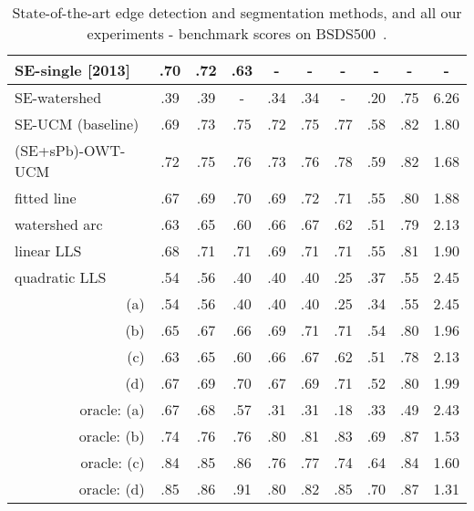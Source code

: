 \begin{table}[htbp]
\begin{tabular}{l|c|c|c||c|c|c||c|c|c|}
\hline
\hline
\multicolumn{1}{|l|}{\cite{DollarICCV13edges} SE-single [2013]} & .70 & .72 & .63 & - & - & - & - & - & - \\
\hline
\hline
\multicolumn{1}{|l|}{SE-watershed} & .39 & .39 & - & .34 & .34 & - & .20 & .75 & 6.26 \\
\hline
\multicolumn{1}{|l|}{SE-UCM (baseline)} & .69 &.73 & .75 & .72 & .75 & .77 & .58 & .82 & 1.80 \\
\hline
\multicolumn{1}{|l|}{(SE+sPb)-OWT-UCM} & .72 & .75 & .76 & .73 & .76 & .78 & .59 & .82 & 1.68 \\ %
\hline
\hline
\multicolumn{1}{|l|}{fitted line} &  .67 & .69 & .70 & .69 & .72 & .71 & .55 & .80 & 1.88 \\ %
\hline
\multicolumn{1}{|l|}{watershed arc} & .63 & .65 & .60 & .66 & .67 & .62 & .51 & .79 & 2.13 \\ %
\hline
\hline
\multicolumn{1}{|l|}{linear LLS} & .68 & .71 & .71 & .69 & .71 & .71 & .55 & .81 & 1.90 \\%
\hline
\multicolumn{1}{|l|}{quadratic LLS} & .54 & .56 & .40 & .40 & .40 & .25 & .37 & .55 & 2.45 \\
\hline
\hline
\multicolumn{1}{|r|}{(a)} & .54 & .56 & .40 & .40 & .40 & .25 & .34 & .55 & 2.45 \\
\multicolumn{1}{|r|}{(b)} & .65 & .67 & .66 & .69 & .71 & .71 & .54 & .80 & 1.96 \\
\multicolumn{1}{|r|}{(c)} & .63 & .65 & .60 & .66 & .67 & .62 & .51 & .78 & 2.13 \\
\multicolumn{1}{|r|}{(d)} & .67 & .69 & .70 & .67 & .69 & .71 & .52 & .80 & 1.99 \\
\multicolumn{1}{|r|}{oracle: (a)} & .67 & .68 & .57 & .31 & .31 & .18 & .33 & .49 & 2.43 \\
\multicolumn{1}{|r|}{oracle: (b)} & .74 & .76 & .76 & .80 & .81 & .83 & .69 & .87 & 1.53 \\
\multicolumn{1}{|r|}{oracle: (c)} & .84 & .85 & .86 & .76 & .77 & .74 & .64 & .84 & 1.60 \\
\multicolumn{1}{|r|}{oracle: (d)} & .85 & .86 & .91 & .80 & .82 & .85 & .70 & .87 & 1.31 \\
\hline
\end{tabular}
\caption[Benchmark scores for SoA and ours]{State-of-the-art edge detection and segmentation methods, and all our experiments - benchmark scores on BSDS500~\cite{BSDS500resources}.}
\label{tab:all-results}
\end{table}

